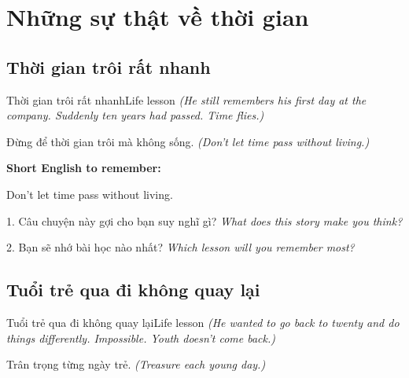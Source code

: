 \chapter{Những sự thật về thời gian}


\section{Thời gian trôi rất nhanh}
\begin{truyen}{Thời gian trôi rất nhanh}{Life lesson}
\textit{(He still remembers his first day at the company. Suddenly ten years had passed. Time flies.)}
\end{truyen}

\begin{baihoc}
Đừng để thời gian trôi mà không sống.
\textit{(Don't let time pass without living.)}
\end{baihoc}

\begin{ghinhoanh}
\textbf{Short English to remember:}

Don't let time pass without living.

\end{ghinhoanh}

\begin{tuhocnhanh}
1. Câu chuyện này gợi cho bạn suy nghĩ gì? \textit{What does this story make you think?}

2. Bạn sẽ nhớ bài học nào nhất? \textit{Which lesson will you remember most?}
\end{tuhocnhanh}
\ngancach


\section{Tuổi trẻ qua đi không quay lại}
\begin{truyen}{Tuổi trẻ qua đi không quay lại}{Life lesson}
\textit{(He wanted to go back to twenty and do things differently. Impossible. Youth doesn't come back.)}
\end{truyen}

\begin{baihoc}
Trân trọng từng ngày trẻ.
\textit{(Treasure each young day.)}
\end{baihoc}

